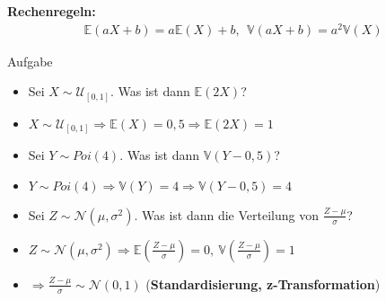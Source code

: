 \documentclass[t,11pt]{beamer}
\begin{document}
\begin{frame}
	\textbf{Rechenregeln:}
	\begin{align*}
	\mathbb{E}(aX+b) = a\mathbb{E}(X) + b, \ \
	\mathbb{V}(aX+b) = a^2\mathbb{V}(X) 
	\end{align*}
	\begin{block}{Aufgabe}
		\begin{itemize}[<+->]
			\item Sei $X\sim \mathcal{U}_{[0,1]}$. Was ist dann $\mathbb{E}(2X)$?
			\item[] $X\sim \mathcal{U}_{[0,1]} \Rightarrow \mathbb{E}(X)=0,5 \Rightarrow \mathbb{E}(2X) = 1$
			\item Sei $Y\sim Poi(4)$. Was ist dann $\mathbb{V}(Y-0,5)$? 
			\item[] $Y\sim Poi(4) \Rightarrow \mathbb{V}(Y)=4 \Rightarrow \mathbb{V}(Y-0,5)=4$
			\item Sei $Z\sim \mathcal{N}(\mu,\sigma^2)$. Was ist dann die Verteilung von $\frac{Z-\mu}{\sigma} $?
			\item[] $Z\sim \mathcal{N}(\mu,\sigma^2) \Rightarrow \mathbb{E}\left(\frac{Z-\mu}{\sigma}\right) =0, \ \mathbb{V}\left(\frac{Z-\mu}{\sigma}\right) =1$
			\item[] $\Rightarrow \frac{Z-\mu}{\sigma} \sim \mathcal{N}(0,1)$ (\textbf{Standardisierung, z-Transformation})
		\end{itemize}
	\end{block}
\end{frame}
\end{document}
